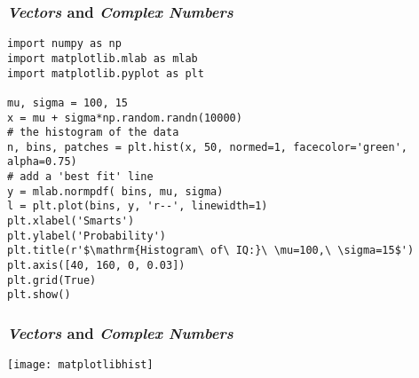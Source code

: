 \begin{frame}[fragile]\frametitle{\emph{Vectors} and \emph{Complex Numbers}}

\begin{lstlisting}
import numpy as np
import matplotlib.mlab as mlab
import matplotlib.pyplot as plt

mu, sigma = 100, 15
x = mu + sigma*np.random.randn(10000)
# the histogram of the data
n, bins, patches = plt.hist(x, 50, normed=1, facecolor='green', 
alpha=0.75)
# add a 'best fit' line
y = mlab.normpdf( bins, mu, sigma)
l = plt.plot(bins, y, 'r--', linewidth=1)
plt.xlabel('Smarts')
plt.ylabel('Probability')
plt.title(r'$\mathrm{Histogram\ of\ IQ:}\ \mu=100,\ \sigma=15$')
plt.axis([40, 160, 0, 0.03])
plt.grid(True)
plt.show()
\end{lstlisting}

\end{frame}

\begin{frame}[fragile]\frametitle{\emph{Vectors} and \emph{Complex Numbers}}
\begin{center}
\texttt{[image: matplotlibhist]}
\end{center}
\end{frame}